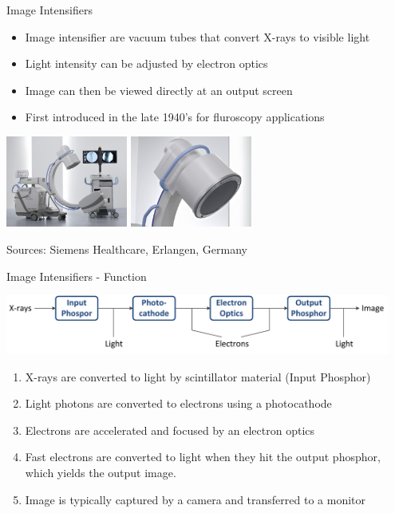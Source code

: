 \begin{frame}{Image Intensifiers}
    \begin{itemize}
        \item Image intensifier are vacuum tubes that convert X-rays to visible light
        \item Light intensity can be adjusted by electron optics
        \item Image can then be viewed directly at an output screen
        \item First introduced in the late 1940's for fluroscopy applications
    \end{itemize}
    \vspace{0.25cm}
    \begin{center}
        \includegraphics[width=0.3\textwidth]{images/ImageIntensifierSiemens2}\hspace{2cm}
        \includegraphics[width=0.3\textwidth]{images/ImageIntensifierSiemens}
    \end{center}
    \begin{flushright}
        \scriptsize Sources: Siemens Healthcare, Erlangen, Germany
    \end{flushright}
\end{frame}

\begin{frame}{Image Intensifiers - Function}
    \begin{center}
        \includegraphics[width=0.95\textwidth]{images/Intensifier_Schematic}
    \end{center}
    \begin{enumerate}
        \item X-rays are converted to light by scintillator material (Input Phosphor)
        \item Light photons are converted to electrons using a photocathode
        \item Electrons are accelerated and focused by an electron optics
        \item Fast electrons are converted to light when they hit the output phosphor, which yields the output image.
        \item Image is typically captured by a camera and transferred to a monitor
    \end{enumerate}
\end{frame}

